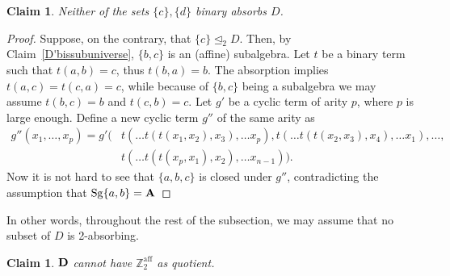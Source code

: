 \documentclass[11pt]{amsart}
\newcommand{\m}[1]{\mathbf{\uppercase{#1}}}
\theoremstyle{definition}
\theoremstyle{remark}
\theoremstyle{plain}
\newtheorem{claim}[thm]{Claim}
\begin{document}
\begin{claim}
    Neither of the sets $\{c\},\{d\}$ binary absorbs $D$.
\end{claim}
\begin{proof}
Suppose, on the contrary, that $\{c\}\trianglelefteq_2 D$. Then, by Claim~\ref{D'bissubuniverse}, $\{b,c\}$ is an (affine) subalgebra.  Let $t$ be a binary term such that $t(a,b)=c$, thus $t(b,a)=b$. The absorption implies $t(a,c)=t(c,a)=c$, while because of $\{b,c\}$ being a subalgebra we may assume $t(b,c)=b$ and $t(c,b)=c$. Let $g'$ be a cyclic term of arity $p$, where $p$ is large enough. Define a new cyclic term $g''$ of the same arity as 
\begin{align*}
g''(x_1,\dotso, x_p) = g'(&t(\dotso t(t(x_1,x_2),x_3),\dotso x_p), t(\dotso t(t(x_2,x_3),x_4),\dotso x_1),\dotso ,\\
& t(\dotso t(t(x_p,x_1),x_2),\dotso x_{n-1})).
\end{align*}
Now it is not hard to see that $\{a,b,c\}$ is closed under $g''$, contradicting the assumption that $\mathrm{Sg}\{a,b\}=\m a$
\end{proof}
In other words, throughout the rest of the subsection, we may assume that no subset of $D$ is 2-absorbing.
\begin{claim}
$\m d$ cannot have $\mathbb{Z}_2^{{\mathrm{aff}}}$ as quotient.
\end{claim}
\end{document}
